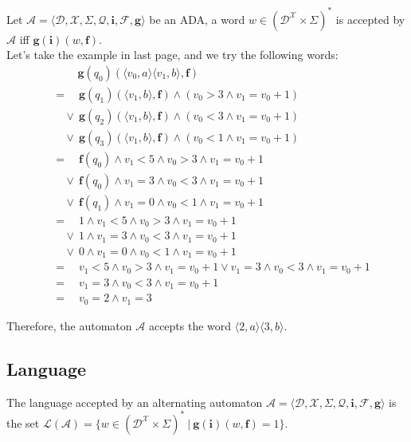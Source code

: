 \documentclass[a4paper, 11pt]{article}
\begin{document}
	Let $\mathcal{A} = \langle \mathcal{D}, \mathcal{X}, \Sigma, \mathcal{Q}, \bm{i}, \mathcal{F}, \bm{g} \rangle$	be an ADA, a word $w \in (\mathcal{D}^{\mathcal{X}} \times \Sigma)^*$ is accepted by $\mathcal{A}$ iff $\bm{g}(\bm{i})(w, \bm{f})$.\\
	
	Let's take the example in last page, and we try the following words:
	\begin{align*}
		&\qquad\ \bm{g}(q_0)(\langle v_0, a \rangle \langle v_1, b \rangle, \bm{f})\\
		&= \quad \bm{g}(q_1)(\langle v_1, b \rangle, \bm{f}) \land (v_0 > 3 \land v_1 = v_0 + 1)\\
			&\quad \lor\ \bm{g}(q_2)(\langle v_1, b \rangle, \bm{f}) \land (v_0 < 3 \land v_1 = v_0 + 1)\\
			&\quad \lor\ \bm{g}(q_3)(\langle v_1, b \rangle, \bm{f}) \land (v_0 < 1 \land v_1 = v_0 + 1)\\
		&= \quad \bm{f}(q_0) \land v_1 < 5 \land v_0 > 3 \land v_1 = v_0 + 1\\
			&\quad \lor\ \bm{f}(q_0) \land v_1 = 3 \land v_0 < 3 \land v_1 = v_0 + 1\\
			&\quad \lor\ \bm{f}(q_1) \land v_1 = 0 \land v_0 < 1 \land v_1 = v_0 + 1\\
		&= \quad 1 \land v_1 < 5 \land v_0 > 3 \land v_1 = v_0 + 1\\
			&\quad \lor\ 1 \land v_1 = 3 \land v_0 < 3 \land v_1 = v_0 + 1\\
			&\quad \lor\ 0 \land v_1 = 0 \land v_0 < 1 \land v_1 = v_0 + 1\\
		&= \quad v_1 < 5 \land v_0 > 3 \land v_1 = v_0 + 1 \lor v_1 = 3 \land v_0 < 3 \land v_1 = v_0 + 1\\
		&= \quad v_1 = 3 \land v_0 < 3 \land v_1 = v_0 + 1\\
		&= \quad v_0 = 2 \land v_1 = 3
	\end{align*}
	
	Therefore, the automaton $\mathcal{A}$ accepts the word $\langle 2, a \rangle \langle 3, b \rangle$.
	
	\subsection{Language}
	
	The language accepted by an alternating automaton $\mathcal{A} = \langle \mathcal{D}, \mathcal{X}, \Sigma, \mathcal{Q}, \bm{i}, \mathcal{F}, \bm{g} \rangle$ is the set $\mathcal{L}(\mathcal{A}) = \{ w \in (\mathcal{D}^{\mathcal{X}} \times \Sigma)^*\ |\ \bm{g}(\bm{i})(w, \bm{f}) = 1 \}$.
	
\end{document}
